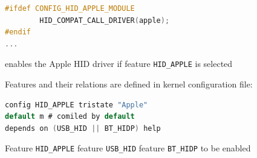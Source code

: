 \documentclass[
    ../../Software_Engineering_Summary.tex,
]
{subfiles}
\begin{document}
\begin{codebox}
    \begin{lstlisting}[language=C]
#ifdef CONFIG_HID_APPLE_MODULE
        HID_COMPAT_CALL_DRIVER(apple);
#endif
...
    \end{lstlisting}
    enables the Apple HID driver if feature \texttt{HID\_APPLE} is selected

    Features and their relations are defined in kernel configuration file:
    \begin{lstlisting}[language=C]
config HID_APPLE tristate "Apple"
default m # comiled by default
depends on (USB_HID || BT_HIDP) help
    \end{lstlisting}

    Feature \texttt{HID\_APPLE}  feature \texttt{USB\_HID}  feature \texttt{BT\_HIDP} to be enabled
\end{codebox}
\end{document}
